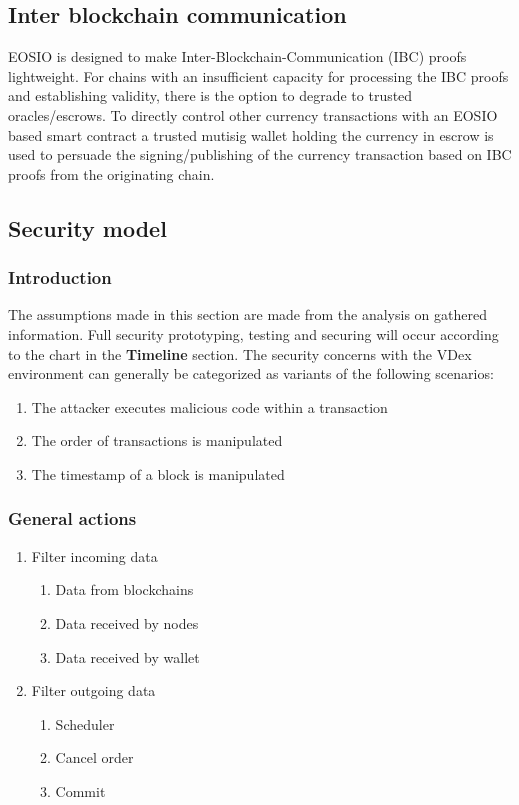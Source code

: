 \documentclass[]{article}
\begin{document}
\subsection{Inter blockchain communication}
EOSIO is designed to make Inter-Blockchain-Communication (IBC) proofs lightweight. 
For chains with an insufficient capacity for processing the  IBC proofs and establishing validity, 
there is the option to degrade to trusted oracles/escrows.
To directly control other currency transactions with an
EOSIO based smart contract a trusted mutisig wallet holding the currency 
in escrow is used to persuade the signing/publishing of the currency 
transaction based on IBC proofs from the originating chain.	
\subsection{Security model}
\subsubsection{Introduction}
The assumptions made in this section are made from the analysis on gathered information.
Full security prototyping, testing and securing will occur according to the chart in the \textbf{Timeline} section. 
The security concerns with the VDex environment can generally be categorized as variants of the following scenarios:
	\begin{enumerate}
		\item The attacker executes malicious code within a transaction
		\item The order of transactions is manipulated
		\item The timestamp of a block is manipulated
	\end{enumerate}
	\subsubsection{General actions}
		\begin{enumerate}	
		\item{Filter incoming data} 
		\begin{enumerate}
			\item Data from blockchains
			\item Data received by nodes
			\item Data received by wallet
		\end{enumerate}
		\item {Filter outgoing data}
		\begin{enumerate}
			\item Scheduler
			\item Cancel order
			\item Commit
		\end{enumerate}
	\end{enumerate}
\end{document}
